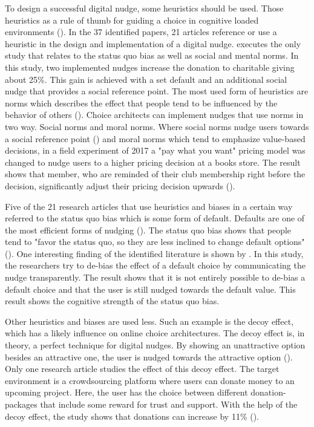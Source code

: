 To design a successful digital nudge, some heuristics should be used. Those heuristics as a rule of thumb for guiding a choice in cognitive loaded environments (\cite{thaler_nudge:_2009}). In the 37 identified papers, 21 articles reference or use a heuristic in the design and implementation of a digital nudge. \cite{zarghamee_nudging_2017} executes the only study that relates to the status quo bias as well as social and mental norms. In this study, two implemented nudges increase the donation to charitable giving about 25\%. This gain is achieved with a set default and an additional social nudge that provides a social reference point.
The most used form of heuristics are norms which describes the effect that people tend to be influenced by the behavior of others (\cite{schneider_digital_2018}). Choice architects can implement nudges that use norms in two way. Social norms and moral norms. Where social norms nudge users towards a social reference point (\cite{wang_socially_2018}) and moral norms which tend to emphasize value-based decisions, in a field experiment of 2017 a "pay what you want" pricing model was changed to nudge users to a higher pricing decision at a books store. The result shows that member, who are reminded of their club membership right before the decision, significantly adjust their pricing decision upwards (\cite{gravert_pride_2017}).

Five of the 21 research articles that use heuristics and biases in a certain way referred to the status quo bias which is some form of default. Defaults are one of the most efficient forms of nudging (\cite{johnson_defaults_2003}). The status quo bias shows that people tend to "favor the status quo, so they are less inclined to change default options" (\cite[p.71]{schneider_digital_2018}). One interesting finding of the identified literature is shown by \cite{steffel_ethically_2016}. In this study, the researchers try to de-bias the effect of a default choice by communicating the nudge transparently. The result shows that it is not entirely possible to de-bias a default choice and that the user is still nudged towards the default value. This result shows the cognitive strength of the status quo bias.

Other heuristics and biases are used less. Such an example is the decoy effect, which has a likely influence on online choice architectures. The decoy effect is, in theory, a perfect technique for digital nudges. By showing an unattractive option besides an attractive one, the user is nudged towards the attractive option (\cite{schneider_digital_2018}). Only one research article studies the effect of this decoy effect. The target environment is a crowdsourcing platform where users can donate money to an upcoming project. Here, the user has the choice between different donation-packages that include some reward for trust and support. With the help of the decoy effect, the study shows that donations can increase by 11\% (\cite{tietz_decoy_2016}).

